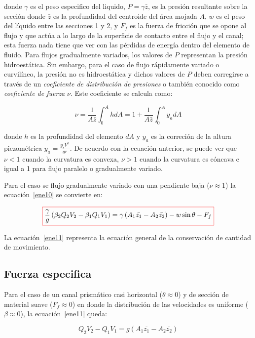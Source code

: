 \documentclass[11pt, oneside]{article}
\begin{document}
donde $\gamma$ es el peso especifico del liquido, $P=\gamma \bar{z}$, es la presi\'on resultante sobre la secci\'on donde $\bar{z}$ es la  profundidad del centroide del \'area mojada $A$, $w$ es el peso del l\'iquido entre las secciones 1 y 2, y $F_f$ es la fuerza de fricci\'on que se opone al flujo y que act\'ua a lo largo de la superficie de contacto entre el flujo y el canal; esta fuerza nada tiene que ver con las p\'erdidas de energ\'ia dentro del elemento de fluido. Para flujos gradualmente variados, los valores de $P$ representan la presi\'on hidroest\'atica. Sin embargo, para el caso de flujo r\'apidamente variado o curvil\'ineo, la presi\'on no es hidroest\'atica y dichos valores de $P$ deben corregirse a trav\'es de un \emph{coeficiente de distribuci\'on de presiones} o tambi\'en conocido como \emph{coeficiente de fuerza} $\nu$. Este coeficiente se calcula como: 

$$
\nu = \frac{1}{A\bar{z}} \int_0^A h dA = 1 + \frac{1}{A\bar{z}} \int_0^A y_a dA
$$

donde $h$ es la profundidad del elemento $dA$ y $y_a$ es la correci\'on de la altura piezom\'etrica $y_a=\frac{y_s V^2}{gr}$. De acuerdo con la ecuaci\'on anterior, se puede ver que $\nu < 1$ cuando la curvatura es convexa, $\nu > 1$ cuando la curvatura es c\'oncava e igual a 1 para flujo paralelo o gradualmente variado. 

Para el caso se flujo gradualmente variado con una pendiente baja ($\nu \approx 1$) la ecuaci\'on~\ref{ene10} se convierte en:

\begin{equation}
\color{red}\boxed{\color{black} \frac{\gamma}{g}\left(\beta_2 Q_2 V_2 - \beta_1 Q_1 V_1 \right) = \gamma \left( A_1 \bar{z_1} - A_2 \bar{z_2} \right) - w \sin \theta - F_f}
\label{ene11}
\end{equation}

La ecuaci\'on~\ref{ene11} representa la ecuaci\'on general de la conservaci\'on de cantidad de movimiento. 
\subsection{Fuerza especifica}
Para el caso de un canal prism\'atico casi horizontal ($\theta \approx 0$) y de secci\'on de material suave ($F_f \approx 0$) en donde la distribuci\'on de las velocidades es uniforme ($\beta \approx 0$), la ecuaci\'on~\ref{ene11} queda:

\begin{equation}
Q_2 V_2 - Q_1 V_1 = g \left( A_1 \bar{z_1} - A_2 \bar{z_2} \right)
\label{ene12}
\end{equation}
\end{document}
